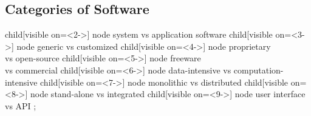



\subsection{Categories of Software}
\begin{frame}{\insertsubsection}
	\centering\tikz[grow cyclic,
	mindmap, every node/.style=concept,concept color=blue!10!background,
	level 1/.append style={level distance=27mm,sibling angle=360/8}]
	child[visible on={<2->}] { node {system vs\phantom{;} application software\phantom{ab}} }
	child[visible on={<3->}] { node {generic vs customized} }
	child[visible on={<4->}] { node {proprietary\\vs open-source} }
	child[visible on={<5->}] { node {freeware\\vs commercial} }
	child[visible on={<6->}] { node {data-intensive vs computation-intensive} }
	child[visible on={<7->}] { node {monolithic vs distributed} }
	child[visible on={<8->}] { node {stand-alone vs integrated} }
	child[visible on={<9->}] { node {user interface vs API\phantom{ab}} }
	;
\end{frame}




